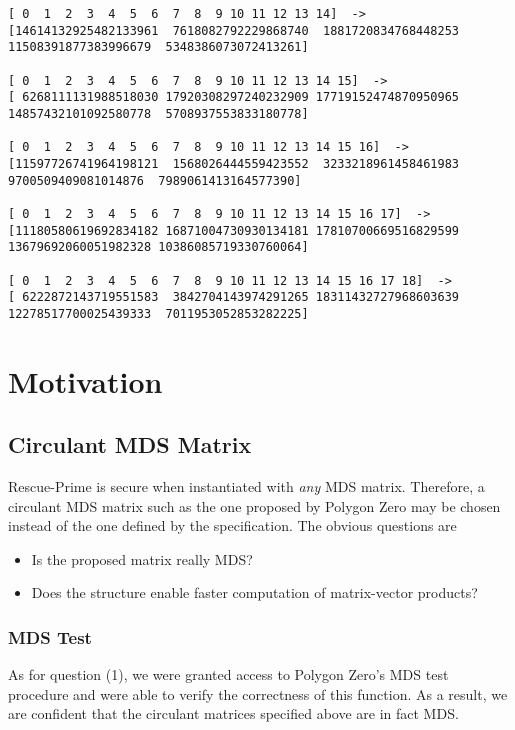 \documentclass[a4paper]{article}
\begin{document}
\begin{lstlisting}
[ 0  1  2  3  4  5  6  7  8  9 10 11 12 13 14]  -> 
[14614132925482133961  7618082792229868740  1881720834768448253 11508391877383996679  5348386073072413261]

[ 0  1  2  3  4  5  6  7  8  9 10 11 12 13 14 15]  -> 
[ 6268111131988518030 17920308297240232909 17719152474870950965 14857432101092580778  5708937553833180778]

[ 0  1  2  3  4  5  6  7  8  9 10 11 12 13 14 15 16]  -> 
[11597726741964198121  1568026444559423552  3233218961458461983  9700509409081014876  7989061413164577390]

[ 0  1  2  3  4  5  6  7  8  9 10 11 12 13 14 15 16 17]  -> 
[11180580619692834182 16871004730930134181 17810700669516829599 13679692060051982328 10386085719330760064]

[ 0  1  2  3  4  5  6  7  8  9 10 11 12 13 14 15 16 17 18]  -> 
[ 6222872143719551583  3842704143974291265 18311432727968603639 12278517700025439333  7011953052853282225]
\end{lstlisting}

\section{Motivation}

\subsection{Circulant MDS Matrix}

Rescue-Prime is secure when instantiated with \emph{any} MDS matrix. Therefore, a circulant MDS matrix such as the one proposed by Polygon Zero may be chosen instead of the one defined by the specification. The obvious questions are
\begin{itemize}
\item[1)] Is the proposed matrix really MDS?
\item[2)] Does the structure enable faster computation of matrix-vector products?
\end{itemize}

\subsubsection{MDS Test}

As for question (1), we were granted access to Polygon Zero's MDS test procedure and were able to verify the correctness of this function. As a result, we are confident that the circulant matrices specified above are in fact MDS.
\end{document}
